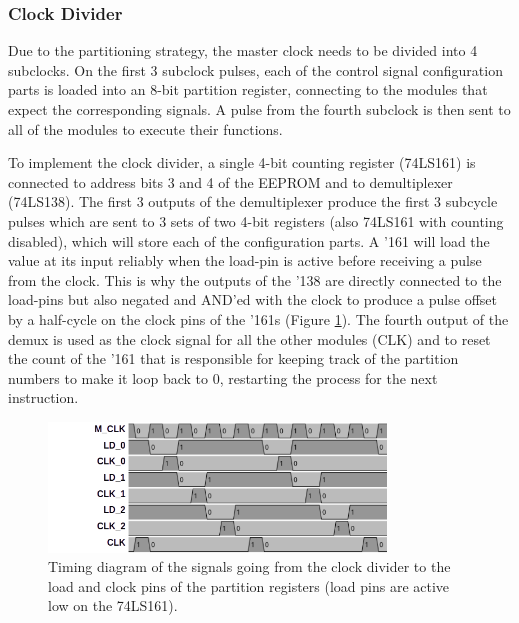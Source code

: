 \subsubsection{Clock Divider}
Due to the partitioning strategy, the master clock needs to be divided into 4 subclocks. On the first 3 subclock pulses, each of the control signal configuration parts is loaded into an 8-bit partition register, connecting to the modules that expect the corresponding signals. A pulse from the fourth subclock is then sent to all of the modules to execute their functions. 

To implement the clock divider, a single 4-bit counting register (74LS161) is connected to address bits 3 and 4 of the EEPROM and to demultiplexer (74LS138). The first 3 outputs of the demultiplexer produce the first 3 subcycle pulses which are sent to 3 sets of two 4-bit registers (also 74LS161 with counting disabled), which will store each of the configuration parts. A '161 will load the value at its input reliably when the load-pin is active before receiving a pulse from the clock. This is why the outputs of the '138 are directly connected to the load-pins but also negated and AND'ed with the clock to produce a pulse offset by a half-cycle on the clock pins of the '161s (Figure \ref{fig:partitioning}). The fourth output of the demux is used as the clock signal for all the other modules (CLK) and to reset the count of the '161 that is responsible for keeping track of the partition numbers to make it loop back to 0, restarting the process for the next instruction.

\begin{figure}[H]
  \centering
  \includegraphics[width=0.8\textwidth]{img/partitioning}
  \caption{Timing diagram of the signals going from the clock divider to the load and clock pins of the partition registers (load pins are active low on the 74LS161).}
  \label{fig:partitioning}
\end{figure}

